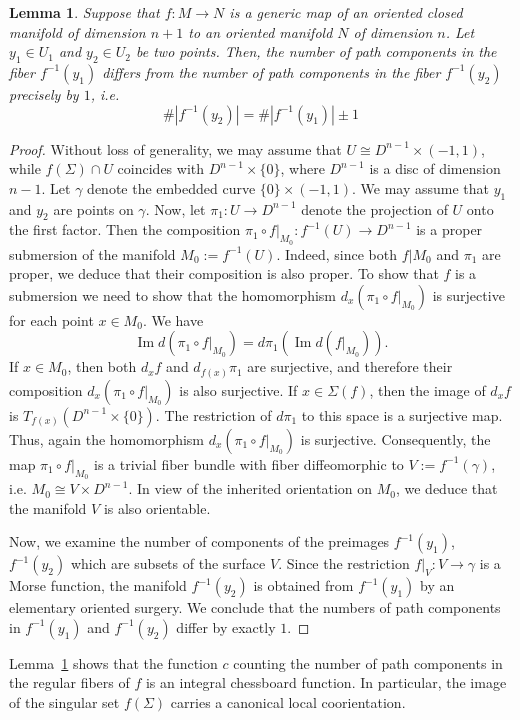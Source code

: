\documentclass[12pt]{amsart}
\def\co{\colon}
\newtheorem{lemma}[theorem]{Lemma}
\theoremstyle{definition}
\begin{document}
\begin{lemma}\label{l:9} Suppose that $f:M \to N$ is a generic map of an oriented closed manifold of dimension $n+1$ to an oriented manifold $N$ of dimension $n$. Let $y_1\in U_1$ and $y_2\in U_2$ be two points. Then,  the number of path components in the fiber $f^{-1}(y_1)$ differs from the number of path components in the fiber $f^{-1}(y_2)$ precisely by $1$, i.e.  
\[
\#|f^{-1}(y_2)| = \#|f^{-1}(y_1)| \pm 1
\]
\end{lemma}
\begin{proof} Without loss of generality, we may assume that $U \cong D^{n-1} \times (-1,1)$, while $f(\Sigma)\cap U$ coincides with $D^{n-1}\times \{0\}$, where $D^{n-1}$ is a disc of dimension $n-1$. Let $\gamma$ denote the embedded curve $\{0\}\times (-1,1)$. We may assume that $y_1$ and $y_2$ are points on $\gamma$.  Now, let $\pi_1:U \to D^{n-1}$ denote the projection of $U$ onto the first factor. Then the composition $\pi_1\circ f|_{M_0}\co f^{-1}(U)\to D^{n-1}$ is a proper submersion of the manifold $M_0:=f^{-1}(U)$. Indeed, since both $f|M_0$  and $\pi_1$ are proper, we deduce that their composition is also proper. To show that $f$ is a submersion we need to show that the homomorphism $d_x(\pi_1\circ f|_{M_0})$ is surjective for each point $x\in M_0$. We have
\[
       \mathop\mathrm{Im} d(\pi_1\circ f|_{M_0}) = d\pi_1(\mathop\mathrm{Im} d(f|_{M_0})).
\]
If $x\in M_0$, then both $d_xf$ and $d_{f(x)}\pi_1$ are surjective, and therefore their composition $d_x(\pi_1\circ f|_{M_0})$ is also surjective. If $x\in \Sigma(f)$, then the image of $d_xf$ is $T_{f(x)}(D^{n-1}\times \{0\})$. The restriction of $d\pi_1$ to this space is a surjective map. Thus, again  the homomorphism $d_x(\pi_1\circ f|_{M_0})$ is surjective.
Consequently, the map $\pi_1\circ f|_{M_0}$ is a trivial fiber  bundle with fiber diffeomorphic to $V:=f^{-1}(\gamma)$, i.e.  $M_0\cong V\times D^{n-1}$. In view of the inherited orientation on $M_0$, we deduce that the manifold $V$ is also orientable. 

Now,  we examine the number of components of the preimages $f^{-1}(y_1)$,  $f^{-1}(y_2)$ which are subsets of the surface $V$.  Since the restriction $f|_V\co V\to \gamma$ is a Morse function, the manifold $f^{-1}(y_2)$ is obtained from $f^{-1}(y_1)$ by an elementary oriented surgery. We conclude that the numbers of path components in $f^{-1}(y_1)$ and $f^{-1}(y_2)$ differ by exactly $1$. 
\end{proof}

Lemma~\ref{l:9} shows that the function $c$ counting the number of path components in the regular fibers of $f$ is an integral chessboard function. In particular, the image of the singular set $f(\Sigma)$ carries a canonical local coorientation. 
\end{document}
